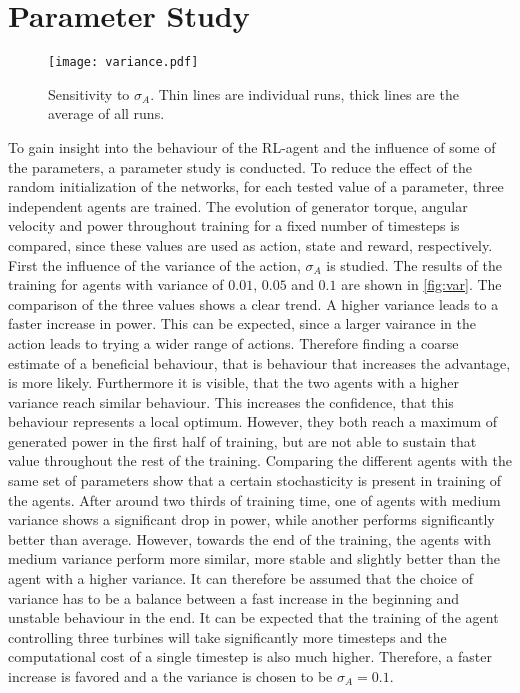 \section{Parameter Study}
\begin{figure}[h]
	\centering
	\texttt{[image: variance.pdf]}
	\caption{Sensitivity to $\sigma_A$. Thin lines are individual runs, thick lines are the average of all runs.}
	\label{fig:var}
\end{figure}
To gain insight into the behaviour of the RL-agent and the influence of some of the parameters, a parameter study is conducted. To reduce the effect of the random initialization of the networks, for each tested value of a parameter, three independent agents are trained. The evolution of generator torque, angular velocity and power throughout training for a fixed number of timesteps is compared, since these values are used as action, state and reward, respectively. \\
First the influence of the variance of the action, $\sigma_A$ is studied. The results of the training for agents with variance of $0.01$, $0.05$ and $0.1$ are shown in \autoref{fig:var}. The comparison of the three values shows a clear trend. A higher variance leads to a faster increase in power. This can be expected, since a larger vairance in the action leads to trying a wider range of actions. Therefore finding a coarse estimate of a beneficial behaviour, that is behaviour that increases the advantage, is more likely. Furthermore it is visible, that the two agents with a higher variance reach similar behaviour. This increases the confidence, that this behaviour represents a local optimum. However, they both reach a maximum of generated power in the first half of training, but are not able to sustain that value throughout the rest of the training. Comparing the different agents with the same set of parameters show that a certain stochasticity is present in training of the agents.  After around two thirds of training time, one of agents with medium variance shows a significant drop in power, while another performs significantly better than average. However, towards the end of the training, the agents with medium variance perform more similar, more stable and slightly better than the agent with a higher variance. It can therefore be assumed that the choice of variance has to be a balance between a fast increase in the beginning and unstable behaviour in the end. It can be expected that the training of the agent controlling three turbines will take significantly more timesteps and the computational cost of a single timestep is also much higher. Therefore, a faster increase is favored and a the variance is chosen to be $\sigma_A = 0.1$. \\
